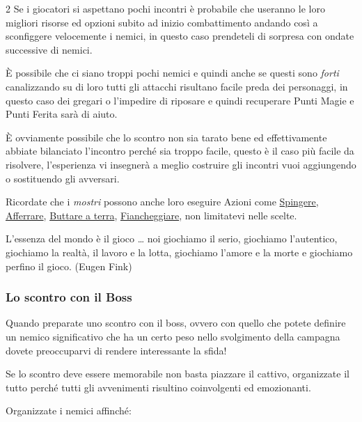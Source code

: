 \begin{multicols}{2}
Se i giocatori si aspettano pochi incontri è probabile che useranno le loro migliori risorse ed opzioni subito ad inizio combattimento andando così a sconfiggere velocemente i nemici, in questo caso prendeteli di sorpresa con ondate successive di nemici.

È possibile che ci siano troppi pochi nemici e quindi anche se questi sono \emph{forti} canalizzando su di loro tutti gli attacchi risultano facile preda dei personaggi, in questo caso dei gregari o l'impedire di riposare e quindi recuperare Punti Magie e Punti Ferita sarà di aiuto.

È ovviamente possibile che lo scontro non sia tarato bene ed effettivamente abbiate bilanciato l'incontro perché sia troppo facile, questo è il caso più facile da risolvere, l'esperienza vi insegnerà a meglio costruire gli incontri vuoi aggiungendo o sostituendo gli avversari.

Ricordate che i \emph{mostri} possono anche loro eseguire Azioni come \hyperlink{spingereavversario}{Spingere}, \hyperlink{afferrareunavversario}{Afferrare}, \hyperlink{farecadereavversario}{Buttare a terra}, \hyperlink{fiancheggiare}{Fiancheggiare}, non limitatevi nelle scelte.

\begin{enfasi}{
L'essenza del mondo è il gioco … noi giochiamo il serio, giochiamo l'autentico, giochiamo la realtà, il lavoro e la lotta, giochiamo l'amore e la morte e giochiamo perfino il gioco. (Eugen Fink)
}\end{enfasi}

\subsubsection{Lo scontro con il Boss}

Quando preparate uno scontro con il boss, ovvero con quello che potete definire un nemico significativo che ha un certo peso nello svolgimento della campagna dovete preoccuparvi di rendere interessante la sfida!

Se lo scontro deve essere memorabile non basta piazzare il cattivo, organizzate il tutto perché tutti gli avvenimenti risultino coinvolgenti ed emozionanti.

Organizzate i nemici affinché:

\begin{itemize}[leftmargin=*] \setlength{\itemsep}{-1pt}


\end{itemize}
\end{multicols}
